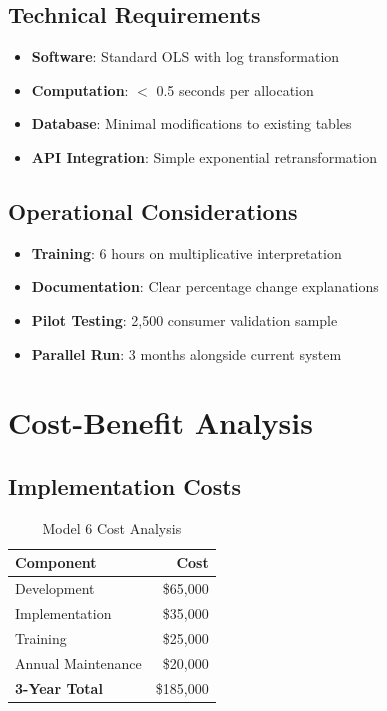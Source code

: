 \subsection{Technical Requirements}

\begin{itemize}
    \item \textbf{Software}: Standard OLS with log transformation
    \item \textbf{Computation}: $<$ 0.5 seconds per allocation
    \item \textbf{Database}: Minimal modifications to existing tables
    \item \textbf{API Integration}: Simple exponential retransformation
\end{itemize}

\subsection{Operational Considerations}

\begin{itemize}
    \item \textbf{Training}: 6 hours on multiplicative interpretation
    \item \textbf{Documentation}: Clear percentage change explanations
    \item \textbf{Pilot Testing}: 2,500 consumer validation sample
    \item \textbf{Parallel Run}: 3 months alongside current system
\end{itemize}

\section{Cost-Benefit Analysis}

\subsection{Implementation Costs}

\begin{table}[h]
\centering
\caption{Model 6 Cost Analysis}
\begin{tabular}{lr}
\toprule
\textbf{Component} & \textbf{Cost} \\
\midrule
Development & \$65,000 \\
Implementation & \$35,000 \\
Training & \$25,000 \\
Annual Maintenance & \$20,000 \\
\midrule
\textbf{3-Year Total} & \$185,000 \\
\bottomrule
\end{tabular}
\end{table}

